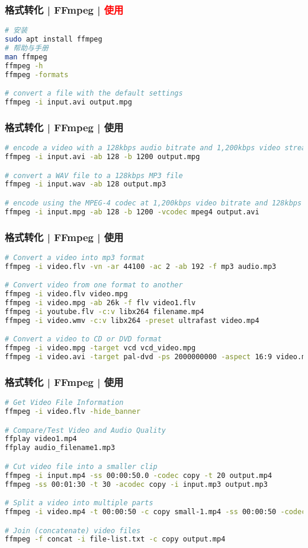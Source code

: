 \begin{frame}[fragile]
  \frametitle{格式转化 | FFmpeg | \textcolor{red}{使用}}
\begin{lstlisting}[language=bash]
# 安装
sudo apt install ffmpeg
# 帮助与手册
man ffmpeg
ffmpeg -h
ffmpeg -formats

# convert a file with the default settings
ffmpeg -i input.avi output.mpg
\end{lstlisting}
\end{frame}

\begin{frame}[fragile]
  \frametitle{格式转化 | FFmpeg | 使用}
\begin{lstlisting}[language=bash,basicstyle=\small\tt]
# encode a video with a 128kbps audio bitrate and 1,200kbps video stream
ffmpeg -i input.avi -ab 128 -b 1200 output.mpg

# convert a WAV file to a 128kbps MP3 file
ffmpeg -i input.wav -ab 128 output.mp3

# encode using the MPEG-4 codec at 1,200kbps video bitrate and 128kbps audio bitrate
ffmpeg -i input.mpg -ab 128 -b 1200 -vcodec mpeg4 output.avi
\end{lstlisting}
\end{frame}

\begin{frame}[fragile]
  \frametitle{格式转化 | FFmpeg | 使用}
\begin{lstlisting}[language=bash,basicstyle=\small\tt]
# Convert a video into mp3 format
ffmpeg -i video.flv -vn -ar 44100 -ac 2 -ab 192 -f mp3 audio.mp3

# Convert video from one format to another
ffmpeg -i video.flv video.mpg
ffmpeg -i video.mpg -ab 26k -f flv video1.flv
ffmpeg -i youtube.flv -c:v libx264 filename.mp4
ffmpeg -i video.wmv -c:v libx264 -preset ultrafast video.mp4

# Convert a video to CD or DVD format
ffmpeg -i video.mpg -target vcd vcd_video.mpg
ffmpeg -i video.avi -target pal-dvd -ps 2000000000 -aspect 16:9 video.mpeg
\end{lstlisting}
\end{frame}

\begin{frame}[fragile]
  \frametitle{格式转化 | FFmpeg | 使用}
\begin{lstlisting}[language=bash,basicstyle=\footnotesize\tt,numberstyle=\scriptsize]
# Get Video File Information
ffmpeg -i video.flv -hide_banner

# Compare/Test Video and Audio Quality
ffplay video1.mp4
ffplay audio_filename1.mp3

# Cut video file into a smaller clip
ffmpeg -i input.mp4 -ss 00:00:50.0 -codec copy -t 20 output.mp4
ffmpeg -ss 00:01:30 -t 30 -acodec copy -i input.mp3 output.mp3

# Split a video into multiple parts
ffmpeg -i video.mp4 -t 00:00:50 -c copy small-1.mp4 -ss 00:00:50 -codec copy small-2.mp4

# Join (concatenate) video files
ffmpeg -f concat -i file-list.txt -c copy output.mp4
\end{lstlisting}
\end{frame}

